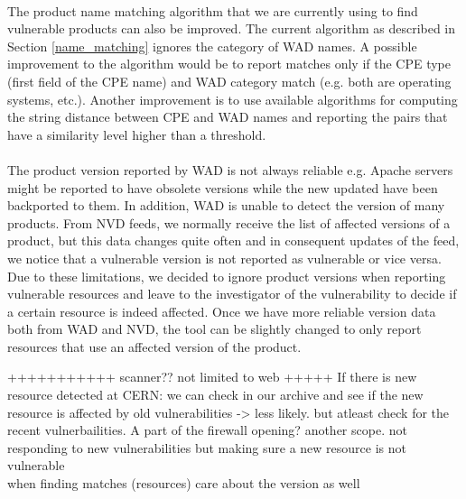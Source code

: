 \paragraph{}
The product name matching algorithm that we are currently using to find vulnerable products can also be improved. The current algorithm as described in Section \ref{name_matching} ignores the category of WAD names. A possible improvement to the algorithm would be to report matches only if the CPE type (first field of the CPE name) and WAD category match (e.g. both are operating systems, etc.). Another improvement is to use available algorithms for computing the string distance between CPE and WAD names and reporting the pairs that have a similarity level higher than a threshold.  
\paragraph{}
The product version reported by WAD is not always reliable e.g. Apache servers might be reported to have obsolete versions while the new updated have been backported to them. In addition, WAD is unable to detect the version of many products. From NVD feeds, we normally receive the list of affected versions of a product, but this data changes quite often and in consequent updates of the feed, we notice that a vulnerable version is not reported as vulnerable or vice versa. Due to these limitations, we decided to ignore product versions when reporting vulnerable resources and leave to the investigator of the vulnerability to decide if a certain resource is indeed affected. Once we have more reliable version data both from WAD and NVD, the tool can be slightly changed to only report resources that use an affected version of the product.


+++++++++++
scanner?? not limited to web
+++++
If there is new resource detected at CERN: we can check in our archive and see if the new resource is affected by old vulnerabilities -> less likely. but atleast check for the recent vulnerbailities. A part of the firewall opening? 
another scope. not responding to new vulnerabilities but making sure a new resource is not vulnerable
\\
when finding matches (resources) care about the version as well



